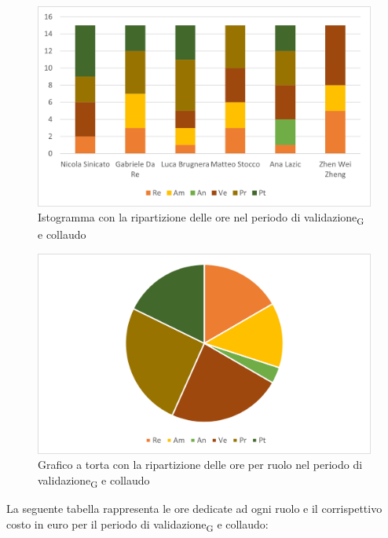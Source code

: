 \begin{figure}[H]
    \centering
    \includegraphics[scale=0.6]{img/grafi preventivo/istogrammi/validazione/complessivo.png}
    \caption{Istogramma con la ripartizione delle ore nel periodo di validazione\textsubscript{G} e collaudo}
\end{figure}
\begin{figure}[H]
    \centering
    \includegraphics[scale=0.6]{img/grafi preventivo/torta/validazione/complessivo.png}
    \caption{Grafico a torta con la ripartizione delle ore per ruolo nel periodo di validazione\textsubscript{G} e collaudo}
\end{figure}
La seguente tabella rappresenta le ore dedicate ad ogni ruolo e il corrispettivo costo in euro per il periodo di validazione\textsubscript{G} e collaudo:

